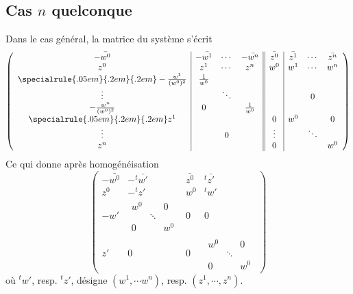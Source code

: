 \documentclass[a4paper,10pt]{article}
\newcommand\transpose[1]{^t\!{#1}}
\begin{document}
\subsection{Cas $n$ quelconque}
Dans le cas général, la matrice du système s'écrit
\[
\left(
\begin{array}{c|ccc||c|ccc}
-\bar{w^0} & -\bar{w^1} & \cdots & -\bar{w^n} & \bar{z^0} & \bar{z^1} & \cdots & \bar{z^n} \\ 
z^0 & z^1 & \cdots & z^n & w^0 & w^1& \cdots & w^n \\ 
\specialrule{.05em}{.2em}{.2em} 
-\frac{w^1}{(w^0)^2} & \frac{1}{w^0} &  & & & & &  \\ 
 \vdots &    &  \ddots&  & && 0 &  \\ 
-\frac{w^n}{(w^0)^2} &  0  &  &  \frac{1}{w^0} & & & &  \\ 
\specialrule{.05em}{.2em}{.2em} 
 z^1&  & &  & 0 & w^0 &  &0 \\
 \vdots & & 0  & &\vdots  & & \ddots  & \\
z^n & & & &0   & &   & w^0 \\
\end{array}
\right)
\]
Ce qui donne après homogénéisation
\[
\left(
\begin{array}{c|c||c|c}
-\bar{w^0} & -\transpose{\bar{w'}} & \bar{z^0} & \transpose{\bar{z'}} \\
z^0 & -\transpose{z'} & w^0 & \transpose{w'} \\ \hline
-w' & 
\begin{matrix}
w^0 & &0 \\
 & \ddots & \\
 0 & & w^0
\end{matrix} & 0 & 0 \\ \hline
z' & 0 & 0& 
\begin{matrix}
w^0 & &0 \\
 & \ddots & \\
 0 & & w^0
\end{matrix}
\end{array}
\right)
\]
où $\transpose{w'}$, resp. $\transpose{z'}$, désigne $(w^1,\cdots w^n)$, resp. $(z^1,\cdots, z^n)$.
\end{document}
